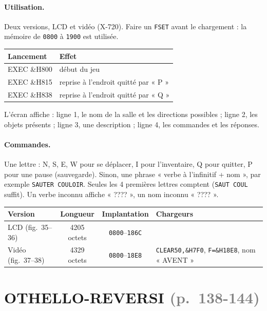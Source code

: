 \documentclass[a4paper,10pt]{article}
\newcommand{\hex}[1]{\texttt{#1}}
\newcommand{\pg}[1]{\texorpdfstring{\textcolor{gray}{\small(p.~#1)}}{}}
\begin{document}
\paragraph{Utilisation.} Deux versions, LCD et vidéo (X-720). Faire un
\texttt{FSET} avant le chargement : la mémoire de \hex{0800} à \hex{1900}
est utilisée.
\begin{center}\small
\begin{tabular}{@{}>{\ttfamily}ll@{}}
\toprule
\normalfont Lancement & Effet \\
\midrule
EXEC \&H800 & début du jeu \\
EXEC \&H815 & reprise à l'endroit quitté par « P » \\
EXEC \&H838 & reprise à l'endroit quitté par « Q » \\
\bottomrule
\end{tabular}
\end{center}
L'écran affiche : ligne 1, le nom de la salle et les directions possibles ;
ligne 2, les objets présents ; ligne 3, une description ; ligne 4, les
commandes et les réponses.

\paragraph{Commandes.} Une lettre : N, S, E, W pour se déplacer, I pour
l'inventaire, Q pour quitter, P pour une pause (sauvegarde). Sinon, une
phrase « verbe à l'infinitif + nom », par exemple
\texttt{SAUTER COULOIR}. Seules les 4 premières lettres comptent
(\texttt{SAUT COUL} suffit). Un verbe inconnu affiche « ???? », un nom
inconnu «     ???? ».

\begin{center}\small
\begin{tabular}{@{}lccl@{}}
\toprule
Version & Longueur & Implantation & Chargeurs \\
\midrule
LCD (fig.~35--36) & 4205 octets & \hex{0800}--\hex{186C} & \\
Vidéo (fig.~37--38) & 4329 octets & \hex{0800}--\hex{18E8} & \texttt{CLEAR50,\&H7F0}, \texttt{F=\&H18E8}, nom « AVENT » \\
\bottomrule
\end{tabular}
\end{center}

\section{OTHELLO-REVERSI \pg{138-144}}
\end{document}
